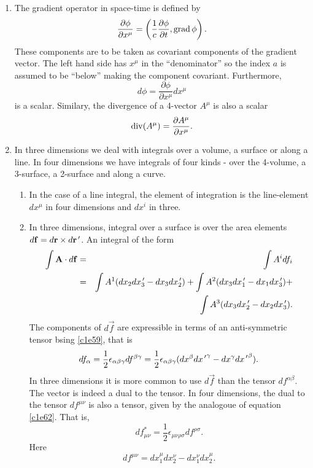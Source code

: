 \begin{enumerate}
\item The gradient operator in space-time is defined by
\begin{equation}\label{c1e65}
\frac{\partial\phi}{\partial x^\mu} = 
\left(\frac{1}{c}\frac{\partial\phi}{\partial t}, \operatorname{grad}\phi\right).
\end{equation}
These components are to be taken as covariant components of the gradient vector.
The left hand side has $x^\mu$ in the ``denominator'' so the index $a$ is assumed
to be ``below'' making the component covariant. Furthermore,
\begin{equation}\label{c1e66}
d\phi = \frac{\partial\phi}{\partial x^\mu}dx^\mu
\end{equation}
is a scalar. Similary, the divergence of a 4-vector $A^\mu$ is also a scalar
\begin{equation}\label{c1e67}
\operatorname{div}(A^\mu) = \frac{\partial A^\mu}{\partial x^\mu}.
\end{equation}

\item In three dimensions we deal with integrals over a volume, a surface or
along a line. In four dimensions we have integrals of four kinds - over the
4-volume, a 3-surface, a 2-surface and along a curve.
\begin{enumerate}
\item In the case of a line integral, the element of integration is the 
line-element $dx^\mu$ in four dimensions and $dx^i$ in three.

\item In three dimensions, integral over a surface is over the area elements 
$d\mathbf{f} = d\mathbf{r} \times d\mathbf{r}^{\,\prime}$. An integral of the form
\begin{eqnarray*}
\int \mathbf{A}\cdot d\mathbf{f} &=& \int A^i df_i \\
 &=& \int A^1(dx_2dx_3^{\,\prime} - dx_3dx_2^{\,\prime}) + 
     \int A^2(dx_3dx_1^{\,\prime} - dx_1dx_3^{\,\prime}) + \\
 & & \int A^3(dx_3dx_2^{\,\prime} - dx_2dx_3^{\,\prime}).
\end{eqnarray*}
The components of $d\vec{f}$ are expressible in terms of an anti-symmetric 
tensor bsing \eqref{c1e59}, that is
\begin{equation}\label{c1e68}
df_\alpha = \frac{1}{2}\epsilon_{\alpha\beta\gamma}df^{\beta\gamma} = 
\frac{1}{2}\epsilon_{\alpha\beta\gamma}(dx^\beta d{x^{\,\prime}}^\gamma - 
dx^\gamma d{x^{\,\prime}}^\beta).
\end{equation}
In three dimensions it is more common to use $d\vec{f}$ than the tensor 
$df^{\alpha\beta}$.  The vector is indeed a dual to the tensor. In four 
dimensions, the dual to the tensor $df^{\mu\nu}$ is also a tensor, given by the 
analogoue of equation \eqref{c1e62}. 
That is,
\begin{equation}\label{c1e69}
df^\ast_{\mu\nu} = \frac{1}{2}\epsilon_{\mu\nu\rho\sigma}df^{\rho\sigma}.
\end{equation}
Here
\begin{equation}\label{c1e70}
df^{\mu\nu} = dx_1^\mu dx_2^\nu - dx_1^\nu dx_2^\mu.
\end{equation}


\end{enumerate}
\end{enumerate}
